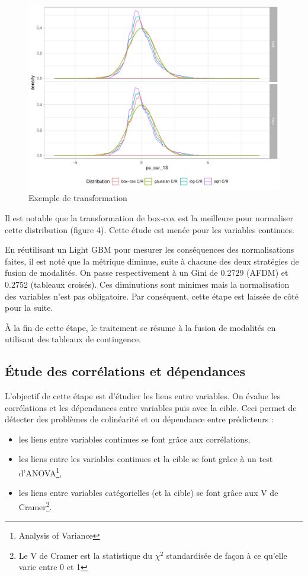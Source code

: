 \documentclass[french]{article}
\begin{document}
\begin{multicols}{2}
\begin{figure}[H] \centering
  \includegraphics[width = 0.99\columnwidth]{img/ex_normalisation}
  \caption{Exemple de transformation}
\end{figure}

Il est notable que la transformation de box-cox est la meilleure pour normaliser cette distribution (figure 4). Cette étude est menée pour les variables continues.

En réutilisant un Light GBM pour mesurer les conséquences des normalisations faites, il est noté que la métrique diminue, suite à chacune des deux stratégies de fusion de modalités. On passe respectivement à un Gini de 0.2729 (AFDM) et 0.2752 (tableaux croisés). Ces diminutions sont minimes mais la normalisation des variables n'est pas obligatoire. Par conséquent, cette étape est laissée de côté pour la suite. 

À la fin de cette étape, le traitement se résume à la fusion de modalités en utilisant des tableaux de contingence.

\subsection{Étude des corrélations et dépendances}

L'objectif de cette étape est d'étudier les liens entre variables. On évalue les corrélations et les dépendances entre variables puis avec la cible. Ceci permet de détecter des problèmes de colinéarité et ou dépendance entre prédicteurs :

\begin{itemize}
    \item les liens entre variables continues se font grâce aux corrélations,
    \item les liens entre les variables continues et la cible se font grâce à un test d'ANOVA\footnote{Analysis of Variance},
    \item les liens entre variables catégorielles (et la cible) se font grâce aux V de Cramer\footnote{Le V de Cramer est la statistique du $\chi^2$ standardisée de façon à ce qu'elle varie entre 0 et 1}.
\end{itemize}


\end{multicols}
\end{document}
